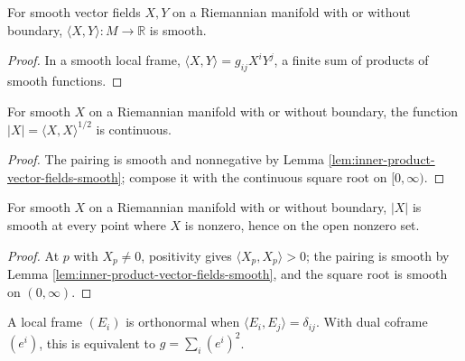 \begin{lemma}
\label{lem:inner-product-vector-fields-smooth}
\leanok
{}
For smooth vector fields $X,Y$ on a Riemannian manifold with or without boundary, $\langle X,Y\rangle:M\to\mathbb R$ is smooth.
\end{lemma}
\begin{proof}
\leanok
{}
\sketch In a smooth local frame, $\langle X,Y\rangle=g_{ij}X^iY^j$, a finite sum of products of smooth functions.
\end{proof}

\begin{lemma}
\label{lem:length-vector-field-continuous}
\leanok
{}
For smooth $X$ on a Riemannian manifold with or without boundary, the function $|X|=\langle X,X\rangle^{1/2}$ is continuous.
\end{lemma}
\begin{proof}
\leanok
{}
\sketch The pairing is smooth and nonnegative by Lemma \ref{lem:inner-product-vector-fields-smooth}; compose it with the continuous square root on $[0,\infty)$.
\end{proof}

\begin{lemma}
\label{lem:length-vector-field-smooth}
\leanok
{}
For smooth $X$ on a Riemannian manifold with or without boundary, $|X|$ is smooth at every point where $X$ is nonzero, hence on the open nonzero set.
\end{lemma}
\begin{proof}
\leanok
{}
\sketch At $p$ with $X_p\ne0$, positivity gives $\langle X_p,X_p\rangle>0$; the pairing is smooth by Lemma \ref{lem:inner-product-vector-fields-smooth}, and the square root is smooth on $(0,\infty)$.
\end{proof}

A local frame $(E_i)$ is orthonormal when $\langle E_i,E_j\rangle=\delta_{ij}$. With dual coframe $(e^i)$, this is equivalent to $g=\sum_i(e^i)^2$.

